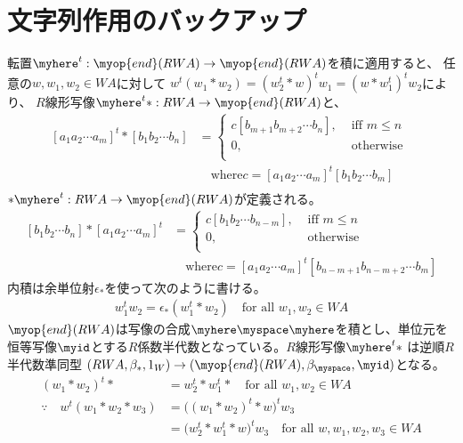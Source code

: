 \section{文字列作用のバックアップ}\label{s1:文字列作用のバックアップ} %
	転置$\myhere^t:\myop{end}(RWA)\to\myop{end}(RWA)$を積に適用すると、
	任意の$w,w_1,w_2\in WA$に対して
	$w^t(w_1*w_2)=(w_2^t*w)^tw_1=(w*w_1^t)^tw_2$により、
	$R$線形写像$\myhere^t*:RWA\to \myop{end}(RWA)$と、
	\begin{equation*}\begin{split} %
		[a_1a_2\cdots a_m]^t*[b_1b_2\cdots b_n]
		&= \begin{cases} %
			c[b_{m+1}b_{m+2}\cdots b_n], &\text{ iff }m\le n \\
			0, &\text{ otherwise } \\
		\end{cases} \\ %
		&\quad\text{where}c=[a_1a_2\cdots a_m]^t[b_1b_2\cdots b_m] \\
	\end{split}\end{equation*} %
	$*\myhere^t:RWA\to \myop{end}(RWA)$が定義される。
	\begin{equation*}\begin{split} %
		[b_1b_2\cdots b_n]*[a_1a_2\cdots a_m]^t
		&= \begin{cases} %
			c[b_{1}b_{2}\cdots b_{n-m}], &\text{ iff }m\le n \\
			0, &\text{ otherwise } \\
		\end{cases} \\ %
		&\quad\text{where}c=[a_1a_2\cdots a_m]^t[b_{n-m+1}b_{n-m+2}\cdots b_m]
	\end{split}\end{equation*} %
	内積は余単位射$\epsilon_*$を使って次のように書ける。
	\begin{equation*}\begin{split} %
		w_1^tw_2 = \epsilon_*(w_1^t*w_2) \quad\text{for all }w_1,w_2\in WA
	\end{split}\end{equation*} %
	$\myop{end}(RWA)$は写像の合成$\myhere\myspace\myhere$を積とし、単位元を
	恒等写像$\myid$とする$R$係数半代数となっている。$R$線形写像$\myhere^t*$
	は逆順$R$半代数準同型
	$(RWA,\beta_*,1_W)\to(\myop{end}(RWA),\beta_\myspace,\myid)$となる。
	\begin{equation*}\begin{split} %
		(w_1*w_2)^t* &= w_2^t*w_1^t* \quad\text{for all }w_1,w_2\in WA \\
		\because\quad w^t(w_1*w_2*w_3) &= \bigl((w_1*w_2)^t*w\bigr)^tw_3 \\
			&= \bigl(w_2^t*w_1^t*w\bigr)^tw_3
			\quad\text{for all }w,w_1,w_2,w_3\in WA
	\end{split}\end{equation*} %

